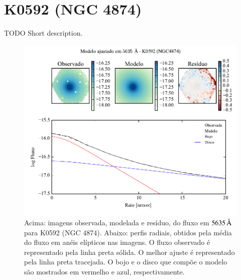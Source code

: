 
\section{K0592 (NGC 4874)}
\label{apendice:Decomp:K0592}

TODO Short description.

\begin{figure}
	\includegraphics[page=1]{figuras-decomp/K0592_sample006a}
	\caption[Ajuste morfológico em $5635\,\angstrom$ de K0592 (NGC 4874)]
	{Acima: imagens observada, modelada e resíduo, do fluxo em $5635\,\angstrom$
	para K0592 (NGC 4874). Abaixo: perfis radiais, obtidos pela média do fluxo em
	anéis elípticos nas imagens. O fluxo observado é representado pela linha preta
	sólida. O melhor ajuste é representado pela linha preta tracejada. O bojo e o
	disco que compõe o modelo são mostrados em vermelho e azul, respectivamente.}
	\label{fig:decompRadprof:K0592}
\end{figure}

